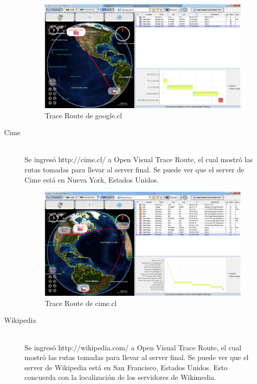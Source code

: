 \documentclass{article}
\begin{document}
\begin{description}
\begin{figure}[H]
\centering
\includegraphics[width=\textwidth]{tracerouteGoogleCL.png}
\caption{Trace Route de google.cl}
\label{fig:google}
\end{figure}    
  
\item[Cime] \hfill \\
Se ingresó http://cime.cl/ a Open Visual Trace Route, el cual mostró las rutas tomadas para llevar al server final. Se puede ver que el server de Cime está en Nueva York, Estados Unidos.

\begin{figure}[H]
\centering
\includegraphics[width=\textwidth]{tracerouteCime.png}
\caption{Trace Route de cime.cl}
\label{fig:cime}
\end{figure}    

\item[Wikipedia] \hfill \\
Se ingresó http://wikipedia.com/ a Open Visual Trace Route, el cual mostró las rutas tomadas para llevar al server final. Se puede ver que el server de Wikipedia está en San Francisco, Estados Unidos. Esto concuerda con la localización de los servidores de Wikimedia\citep{website:wikimedia}.


\end{description}
\end{document}
